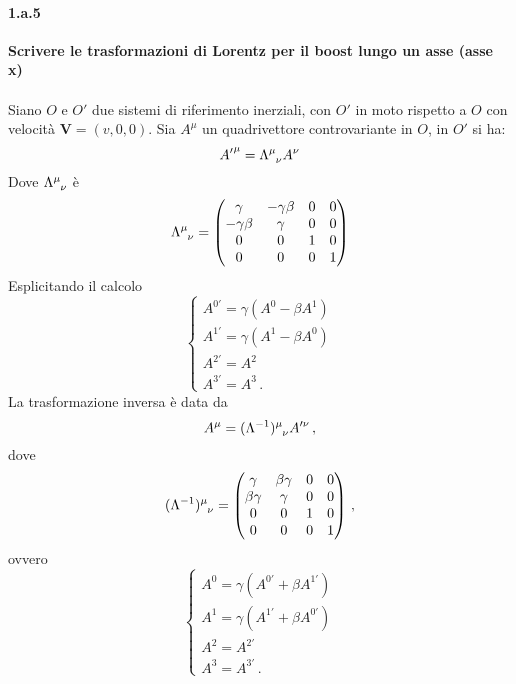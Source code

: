 \documentclass[twoside]{article}
\begin{document}
\paragraph{1.a.5}\textbf{ Scrivere le trasformazioni di Lorentz per il boost lungo un asse (asse x)}\\
\\
Siano $O$ e $O'$ due sistemi di riferimento inerziali, con $O'$ in moto rispetto a $O$ con velocità $\mathbf{V}=(v,0,0)$. Sia $A^{\mu}$ un quadrivettore controvariante in $O$, in $O'$ si ha:
\begin{equation*}
    {A'}^{\mu}=\tensor{\Lambda}{^{\mu}_{\nu}}A^{\nu}
\end{equation*}
Dove $\tensor{\Lambda}{^{\mu}_{\nu}}$ è  
\[
\tensor{\Lambda}{^{\mu}_{\nu}}=\begin{pmatrix}
\gamma & -\gamma\beta & 0 & 0 \\
-\gamma\beta & \gamma & 0 & 0 \\
0 & 0 & 1 & 0 \\
0 & 0 & 0 & 1 \\
\end{pmatrix}
\]
Esplicitando il calcolo
\begin{equation*}
    \begin{cases}
        A^{0'} = \gamma (A^{0} - \beta A^{1})   \\
        A^{1'} = \gamma (A^{1} - \beta A^{0}) 	\\
        A^{2'} = A^{2}	\\
        A^{3'} = A^{3} \, .
    \end{cases}
\end{equation*}
La trasformazione inversa è data da
\begin{equation}
A^\mu=\tensor{(\Lambda^{-1})}{^\mu_\nu} A'^\nu \, ,
\end{equation}
dove
\begin{equation}
\tensor{(\Lambda^{-1})}{^\mu_\nu}=
\begin{pmatrix}
	\gamma		& \beta\gamma 	& 0 & 0 \\
\beta\gamma 	&  \gamma		& 0 & 0 \\
 		0		& 		0		& 1 & 0 \\
 		0		&		0		& 0 & 1 \\
\end{pmatrix} \, ,
\end{equation}
ovvero
\begin{equation}
\begin{cases}
A^{0} = \gamma (A^{0'} + \beta A^{1'})  \\
A^{1} = \gamma (A^{1'} + \beta A^{0'}) 	\\
A^{2} = A^{2'}	\\
A^{3} = A^{3'} \, .
\end{cases}
\end{equation}
\end{document}
